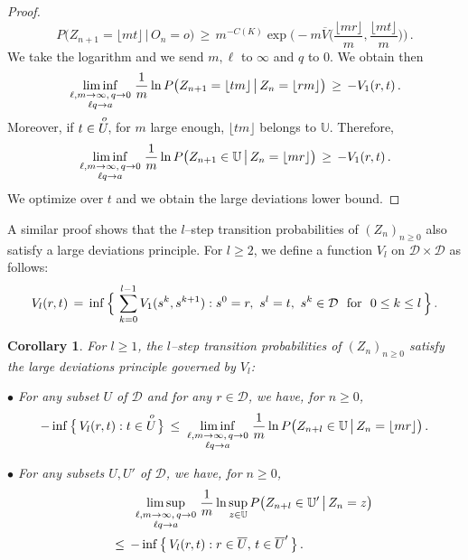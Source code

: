 \documentclass[a4paper,12pt]{article}
\newtheorem{corollary}[theorem]{Corollary}
\theoremstyle{definition}
\theoremstyle{remark}
\def \cB {\mathcal{B}}
\def \cD {\mathcal{D}}
\def \b {\beta}
\def \t {\theta}
\def \dU {\mathbb{U}}
\def \Zt {(Z_n)_{n\geq 0}}
\def\uro{\smash{{U}^{\!\!\!\!\raise5pt\hbox{$\scriptstyle o$}}}}
\begin{document}
\begin{proof}
$$
P\big(Z_{n+1}=\lfloor mt\rfloor
\,|\, O_n=o\big)
\,\geq\,
m^{-C(K)}\exp\bigg(
-m
\overline{V}\bigg(
\frac{\lfloor mr\rfloor}{m},\frac{\lfloor mt\rfloor}{m}
\bigg)
\bigg)\,.
$$
We take the logarithm and we send
$m,\ell$ to $\infty$ and $q$ to $0$.
We obtain then
$$
\liminf_{\genfrac{}{}{0pt}{1}{\ell,m\to\infty,\,q\to 0}{{\ell q} \to a}}
\frac{1}{m}\ln P\big(
Z_{n+1}=\lfloor tm \rfloor
\,\big|\,
Z_n=\lfloor r m \rfloor
\big)
\,\geq\,
-V_1(r,t)\,.
$$
Moreover, if
$t\in\uro$,
for $m$ large enough,
$\lfloor tm \rfloor$ belongs to $\dU$.
Therefore,
$$
\liminf_{\genfrac{}{}{0pt}{1}{\ell,m\to\infty,\,q\to 0}{{\ell q} \to a}}
\frac{1}{m}\ln P\big(
Z_{n+1}\in \dU
\,\big|\,
Z_n=\lfloor m r \rfloor
\big)
\,\geq\,
-V_1(r,t)\,.
$$
We optimize over 
$t$ 
and we obtain the large deviations lower bound.
\end{proof}
A similar proof shows that the $l$--step transition probabilities of $\Zt$
also satisfy a large deviations principle.
For $l\geq 2$,
we define a function 
$V_l$ on $\cD\times\cD$ as follows:
$$
V_l(r,t)
\,=\,
\inf\Big\lbrace\,
\sum_{k=0}^{l-1} V_1(s^k,s^{k+1}):\\
s^0=r,\ s^l=t,\ 
s^k\in\cD
\ \text{ for }\ 0\leq k\leq l
\,\Big\rbrace\,.
$$
\begin{corollary}\label{pgdtransl}
For 
$l\geq 1$,
the $l$--step transition probabilities of
$(Z_n)_{n\geq 0}$
satisfy the large deviations principle governed by
$V_l$:

$\bullet$ For any subset $U$ of $\cD$ and for any $r\in\cD$,
we have, for $n\geq 0$,
$$
-\inf\big\lbrace\,
V_l(r,t):t\in \uro
\,\big\rbrace\,
\leq\,\liminf_{\genfrac{}{}{0pt}{1}{\ell,m\to\infty,\,q\to 0}{{\ell q} \to a}}
\frac{1}{m}\ln P\big( Z_{n+l}\in \dU \,\big|\, Z_n=\lfloor mr  \rfloor \big)\,.%
$$

$\bullet$ For any subsets $U,U'$ of $\cD$,
we have, for $n\geq 0$,
\begin{multline*}
\hspace*{30 pt}\limsup_{\genfrac{}{}{0pt}{1}{\ell,m\to\infty,\,q\to 0}{{\ell q} \to a}}
\frac{1}{m}\ln \sup_{z\in \dU} P\big( Z_{n+l}\in \dU' \,\big|\, Z_n=z \big)
\\\leq\,
-\inf\big\lbrace\,
V_l(r,t):
r\in \overline{U},\,
t\in \overline{U}'
\,\big\rbrace\,.\hspace*{40 pt}
\end{multline*}
\end{corollary}
\end{document}
